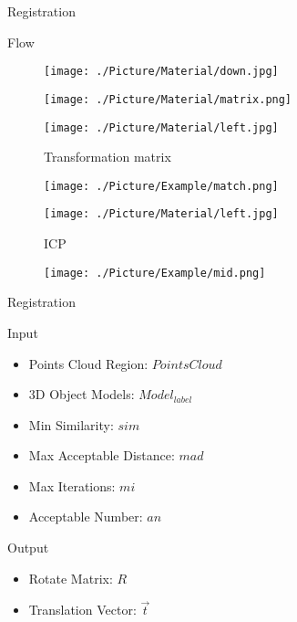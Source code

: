\documentclass[xcolor=table,compress,blue]{beamer}
\begin{document}
\begin{frame}{Registration}
\begin{exampleblock}{Flow}
\begin{figure}[htpb]
\begin{minipage}[b]{0.8in}
			\end{minipage}
			\begin{minipage}[b]{0.6in}
				\centerline{ \texttt{[image: ./Picture/Material/down.jpg]} }
			\end{minipage}
		\end{figure}
		\vspace{-50pt} 
		\hspace{-65pt}
		\vspace{15pt} 
		\begin{figure}[htpb]
			\centering
			\begin{minipage}[b]{0.8in}
				\centerline{ \texttt{[image: ./Picture/Material/matrix.png]} }
			\end{minipage}
			\begin{minipage}[b]{0.8in}
				\centerline{ \quad}
				\centerline{ \texttt{[image: ./Picture/Material/left.jpg]} }
				\centerline{\tiny{Transformation matrix}}
			\end{minipage}
			\begin{minipage}[b]{0.8in}
				\centerline{ \texttt{[image: ./Picture/Example/match.png]} }
			\end{minipage}
			\begin{minipage}[b]{0.8in}
				\centerline{ \texttt{[image: ./Picture/Material/left.jpg]} }
				\centerline{\tiny{ICP}}
			\end{minipage}
			\begin{minipage}[b]{0.8in}
				\centerline{ \texttt{[image: ./Picture/Example/mid.png]} }
			\end{minipage}
		\end{figure}
	\end{exampleblock}
\end{frame}
\begin{frame}{Registration}
	\begin{exampleblock}{Input}
		\begin{itemize}		
			\item  Points Cloud Region: $Points Cloud$
			\item  3D Object Models: $Model_{label}$
			\item  Min Similarity: $sim$
			\item  Max Acceptable Distance: $mad$
			\item  Max Iterations: $mi$ 
			\item  Acceptable Number: $an$
		\end{itemize}
	\end{exampleblock}
	\begin{exampleblock}{Output}
		\begin{itemize}
			\item Rotate Matrix: $R$
			\item Translation Vector: $\vec t$ 
		\end{itemize}
	\end{exampleblock}
\end{frame}
\end{document}
